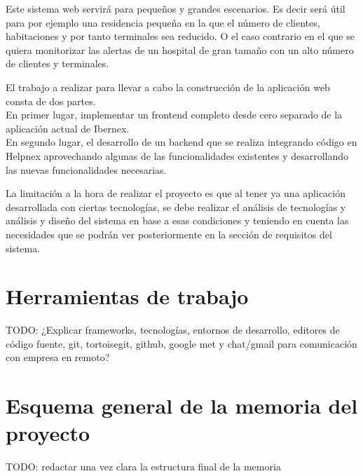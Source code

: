 Este sistema web servirá para pequeños y grandes escenarios. Es decir será útil para por ejemplo una residencia pequeña en la que el número de clientes, habitaciones y por tanto terminales sea reducido. O el caso contrario en el que se quiera monitorizar las alertas de un hospital de gran tamaño con un alto número de clientes y terminales.

El trabajo a realizar para llevar a cabo la construcción de la aplicación web consta de dos partes.\\

En primer lugar, implementar un frontend completo desde cero separado de la aplicación actual de Ibernex.\\

En segundo lugar, el desarrollo de un backend que se realiza integrando código en Helpnex aprovechando algunas de las funcionalidades existentes y desarrollando las nuevas funcionalidades necesarias. \newline

La limitación a la hora de realizar el proyecto es que al tener ya una aplicación desarrollada con ciertas tecnologías, se debe realizar el análisis de tecnologías y análisis y diseño del sistema en base a esas condiciones y teniendo en cuenta las necesidades que se podrán ver posteriormente en la sección de requisitos del sistema. 


\section{Herramientas de trabajo}


TODO: ¿Explicar frameworks, tecnologías, entornos de desarrollo, editores de código fuente, git, tortoisegit, github, google met y chat/gmail para comunicación con empresa en remoto?

\section{Esquema general de la memoria del proyecto}


TODO: redactar una vez clara la estructura final de la memoria








